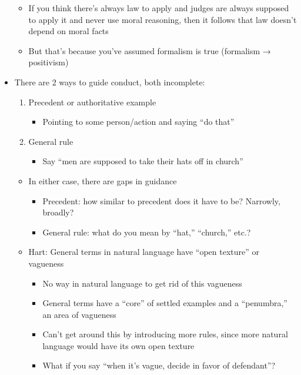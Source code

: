 \begin{itemize}
  \begin{itemize}
  \tightlist
  \item
    If you think there's always law to apply and judges are always
    supposed to apply it and never use moral reasoning, then it follows
    that law doesn't depend on moral facts
  \item
    But that's because you've assumed formalism is true (formalism →
    positivism)
  \end{itemize}
\item
  There are 2 ways to guide conduct, both incomplete:

  \begin{enumerate}
  \def\labelenumi{\arabic{enumi}.}
  \tightlist
  \item
    Precedent or authoritative example

    \begin{itemize}
    \tightlist
    \item
      Pointing to some person/action and saying ``do that''
    \end{itemize}
  \item
    General rule

    \begin{itemize}
    \tightlist
    \item
      Say ``men are supposed to take their hats off in church''
    \end{itemize}
  \end{enumerate}

  \begin{itemize}
  \tightlist
  \item
    In either case, there are gaps in guidance

    \begin{itemize}
    \tightlist
    \item
      Precedent: how similar to precedent does it have to be? Narrowly,
      broadly?
    \item
      General rule: what do you mean by ``hat,'' ``church,'' etc.?
    \end{itemize}
  \item
    Hart: General terms in natural language have ``open texture'' or
    vagueness

    \begin{itemize}
    \tightlist
    \item
      No way in natural language to get rid of this vagueness
    \item
      General terms have a ``core'' of settled examples and a
      ``penumbra,'' an area of vagueness
    \item
      Can't get around this by introducing more rules, since more
      natural language would have its own open texture
    \item
      What if you say ``when it's vague, decide in favor of defendant''?


\end{itemize}
\end{itemize}
\end{itemize}
